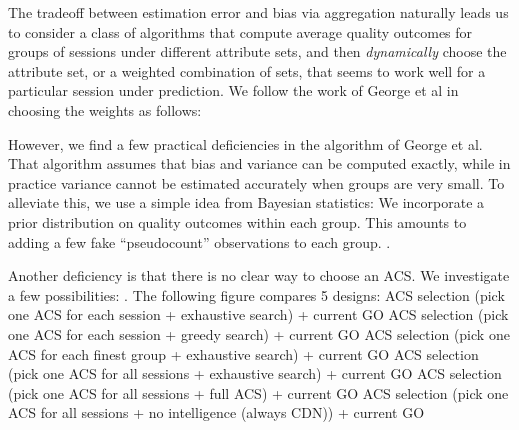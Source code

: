 \label{prediction}
The tradeoff between estimation error and bias via aggregation naturally leads us to consider a class of algorithms that compute average quality outcomes for groups of sessions under different attribute sets, and then {\it dynamically} choose the attribute set, or a weighted combination of sets, that seems to work well for a particular session under prediction.  We follow the work of George et al \cite{george2008value} in choosing the weights as follows: \fillme

However, we find a few practical deficiencies in the algorithm of George et al.  That algorithm assumes that bias and variance can be computed exactly, while in practice variance cannot be estimated accurately when groups are very small.  To alleviate this, we use a simple idea from Bayesian statistics: We incorporate a prior distribution on quality outcomes within each group.  This amounts to adding a few fake ``pseudocount'' observations to each group.  \fillme.


Another deficiency is that there is no clear way to choose an ACS.  We investigate a few possibilities: \fillme . The following figure compares 5 designs:
ACS selection (pick one ACS for each session + exhaustive search) + current GO
ACS selection (pick one ACS for each session + greedy search) + current GO
ACS selection (pick one ACS for each finest group + exhaustive search) + current GO
ACS selection (pick one ACS for all sessions + exhaustive search) + current GO
ACS selection (pick one ACS for all sessions + full ACS) + current GO
ACS selection (pick one ACS for all sessions + no intelligence (always CDN)) + current GO



